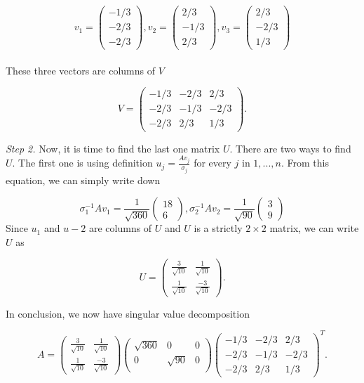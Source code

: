 \documentclass{article}
\begin{document}
\[v_1 = 
	\begin{pmatrix}
		-1/3 \\
		-2/3 \\
		-2/3
	\end{pmatrix},
	v_2 = \begin{pmatrix}
				2/3 \\
				-1/3 \\
				2/3
			\end{pmatrix},
			v_3 = \begin{pmatrix}
							2/3 \\
							-2/3 \\
							1/3
						\end{pmatrix}\]
\\
These three vectors are columns of $V$

\[V= 
\begin{pmatrix}
	-1/3 & -2/3 & 2/3 \\
	-2/3 & -1/3 & -2/3 \\
	-2/3 & 2/3 & 1/3 
\end{pmatrix}.\]

\textit{Step 2.} Now, it is time to find the last one matrix $U$. There are two ways to find $U$. The first one is using definition $u_j = \frac{Av_j}{\sigma_j} $ for every $j$ in $1,...,n$. From this equation, we can simply write down

\[\sigma_1^{-1} Av_1 = \frac{1}{\sqrt{360}} 
	\begin{pmatrix}
		18 \\
		6
	\end{pmatrix},
	\sigma_2^{-1} Av_2 = \frac{1}{\sqrt{90}} 
	\begin{pmatrix}
		3 \\
		9
	\end{pmatrix}\]
Since $u_1$ and $u-2$ are columns of $U$ and $U$ is a strictly $2 \times 2$ matrix, we can write $U$ as 

\[U= 
\begin{pmatrix}
	\frac{3}{\sqrt{10}} & \frac{1}{\sqrt{10}} \\
	\frac{1}{\sqrt{10}} & \frac{-3}{\sqrt{10}}  
\end{pmatrix}.\]

\vspace{1mm} 

In conclusion, we now have singular value decomposition

\[A= 
\begin{pmatrix}
	\frac{3}{\sqrt{10}} & \frac{1}{\sqrt{10}} \\
	\frac{1}{\sqrt{10}} & \frac{-3}{\sqrt{10}}  
\end{pmatrix}
\begin{pmatrix}
	\sqrt{360} & 0 & 0 \\
	0 & \sqrt{90} & 0 \\
\end{pmatrix}
\begin{pmatrix}
	-1/3 & -2/3 & 2/3 \\
	-2/3 & -1/3 & -2/3 \\
	-2/3 & 2/3 & 1/3 
\end{pmatrix}^T.\]
\end{document}
